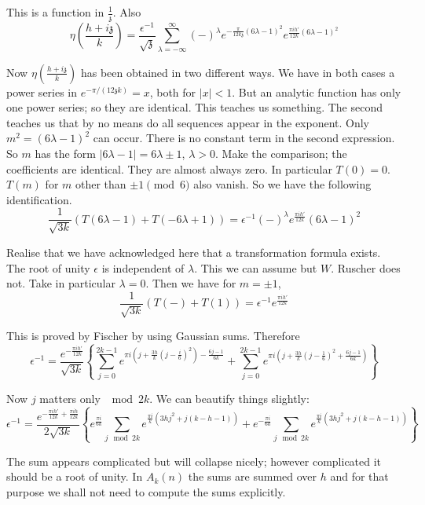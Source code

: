 This is a function in $\frac{1}{ \mathfrak{z}}$. Also
$$
\eta \left( \frac{h+ i \mathfrak{z}}{k}\right) = \frac{\epsilon^{-1}}{\sqrt{
    \mathfrak{z}}} \sum^\infty_{\lambda =- \infty} (-)^\lambda  e^{- \frac{\pi
    }{12k \mathfrak{z}} (6 \lambda -1)^2} e^{\frac{\pi ih'}{12k}(6
  \lambda -1)^2}
$$

Now $\eta\left( \frac{h+ i \mathfrak{z}}{k}\right)$ has been obtained
in two different ways. We have in both cases a power series in $e^{-
  \pi /(12\mathfrak{z}k)}=x$, both for $|x|<1$. But an analytic
function has only one power series; so they are identical. This
teaches us something. The second teaches us that by no means do all
sequences appear in the \pageoriginale exponent. Only $m^2 = (6
\lambda-1)^2$ can occur. There is no constant term in the second
expression. So $m$ has the form $|6 \lambda-1|= 6 \lambda \pm 1$, 
$\lambda >0$. Make the comparison; the coefficients are
identical. They are almost always zero. In particular
$T(0)=0$. $T(m)$ for $m$ other than $\pm 1 \pmod{6}$ also
vanish. So we have the following identification. 
$$
\frac{1}{\sqrt{3 k}}  \left( T (6 \lambda-1)+ T(-6\lambda+1)\right)=
\epsilon^{-1} (-)^\lambda e^{\frac{\pi i h'}{12k}} (6 \lambda-1)^2
$$

Realise that we have acknowledged here that a transformation formula
exists. The root of unity $\epsilon $ is independent of $\lambda$. This we
can assume but $W$. Ruscher does not. Take in particular
$\lambda=0$. Then we have for $m= \pm 1$, 
$$
\frac{1}{\sqrt{3k}} (T(-)+ T(1))= \epsilon^{-1} e^{\frac{\pi i h'}{12k}}
$$

This is proved by Fischer by using Gaussian sums. Therefore
$$
\epsilon^{-1} = \frac{e^{-\frac{\pi i h'}{12k}}}{\sqrt{3k}} \left\{
\sum^{2k-1}_{j=0} e^{\pi i(j+ \frac{3h}{k} (j- \frac{i}{6})^2)-
  \frac{6j-1}{6k}}+ \sum^{2k-1}_{j=0} e^{\pi i \left(j+ \frac{3h}{k} (j-
  \frac{1}{6})^2 + \frac{6j-1}{6k}\right)}\right\}
$$

Now $j$ matters only $\mod 2k$. We can beautify things slightly:
$$
\epsilon^{-1} = \frac{e^{-\frac{\pi i h'}{12k}+ \frac{\pi i
    h}{12k}}}{2\sqrt{3k}} \left\{ e^{\frac{\pi i}{6k}}
\sum_{j \mod 2k}  e^{\frac{\pi i}{k} (3 hj^2 + j(k-h-1))}
  + e^{-\frac{\pi i}{6k}} \sum_{j\mod 2k} e^{\frac{\pi i}{k} \left(3hj^2+ j(
    k-h-1)\right)}\right\}
$$

The sum appears complicated but will collapse nicely; however
complicated it should be a root of unity. In $A_k(n)$ the sums are
summed over $h$ and for that purpose we shall not need to compute the
sums explicitly. 

